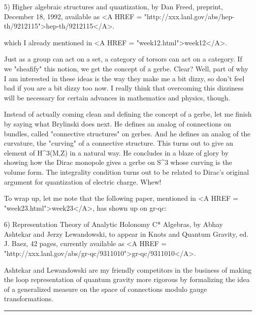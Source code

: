5) Higher algebraic structures and quantization, by Dan Freed,
preprint, December 18, 1992, available as <A HREF = "http://xxx.lanl.gov/abs/hep-th/9212115">hep-th/9212115</A>.  

which I already mentioned in <A HREF = "week12.html">week12</A>.  

Just as a group can act on a set, a category of torsors can act on a 
category.  If we "sheafify" this notion, we get the concept of a gerbe.   
Clear?  Well, part of why I am interested in these ideas is the way they 
make me a bit dizzy, so don't feel bad if you are a bit dizzy too now.  
I really think that overcoming this dizziness will be necessary for certain 
advances in mathematics and physics, though.  

Instead of actually coming clean and defining the concept of a gerbe, let
me finish by saying what Brylinski does next.  He defines an analog of
connections on bundles, called "connective structures" on gerbes.  And he
defines an analog of the curvature, the "curving" of a connective
structure.  This turns out to give an element of H^3(M,Z) in a natural
way.   He concludes in a blaze of glory by showing how the Dirac
monopole gives a gerbe on S^3 whose curving is the volume form.  The
integrality condition turns out to be related to Dirac's original
argument for quantization of electric charge.  Whew!   

To wrap up, let me note that the following paper, mentioned in <A HREF = "week23.html">week23</A>,
has shown up on gr-qc:

6) Representation Theory of Analytic Holonomy C* Algebras, by Abhay
Ashtekar and Jerzy Lewandowski, to appear in Knots and Quantum Gravity,
ed. J. Baez, 42 pages, currently available as <A HREF = "http://xxx.lanl.gov/abs/gr-qc/9311010">gr-qc/9311010</A>.  

Ashtekar and Lewandowski are my friendly competitors in the business of
making the loop representation of quantum gravity more rigorous by
formalizing the idea of a generalized measure on the space of
connections modulo gauge transformations.
\par\noindent\rule{\textwidth}{0.4pt}

